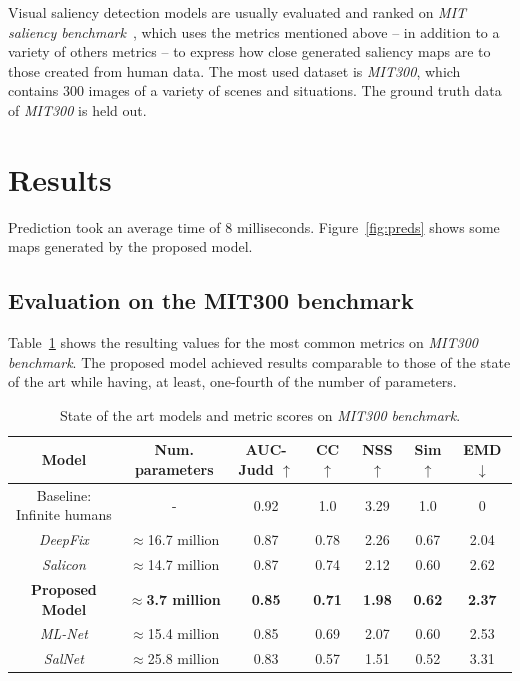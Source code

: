\documentclass[10pt,twocolumn,letterpaper]{article}
\begin{document}
Visual saliency detection models are usually evaluated and ranked on
\emph{MIT saliency benchmark}~\cite{mit_sal_bm}, which uses the metrics
mentioned above -- in addition to a variety of others metrics --
to express how close generated saliency maps are to those created
from human data.
The most used dataset is \emph{MIT300},
which contains $300$ images of a variety of scenes and situations.
The ground truth data of \emph{MIT300} is held out.

\section{Results}
Prediction took an average time of 8 milliseconds.
Figure~\ref{fig:preds} shows some maps generated by the proposed model.

\subsection{Evaluation on the MIT300 benchmark}
Table~\ref{table:results} shows the resulting values for the most common
metrics on \emph{MIT300 benchmark}.
The proposed model achieved results comparable to those of the state of
the art while having, at least, one-fourth of the number of parameters.

\begin{table}
	\small
    \begin{center}
    \label{table:results}
    \caption{State of the art models and metric scores on
    \emph{MIT300 benchmark}.}
    \begin{tabular}{|c|c|c|c|c|c|c|}
        \hline
        Model & Num. parameters & AUC-Judd $\uparrow$ & CC $\uparrow$
            & NSS $\uparrow$ & Sim $\uparrow$ & EMD $\downarrow$\\
        \hline
        Baseline: Infinite humans & - & 0.92 & 1.0 & 3.29 & 1.0 & 0\\
        \hline
        \emph{DeepFix} & $\approx$16.7 million & 0.87 & 0.78
            & 2.26 & 0.67 & 2.04\\
        \hline
        \emph{Salicon} & $\approx$14.7 million & 0.87 & 0.74 & 2.12
            & 0.60 & 2.62\\
        \hline
        \textbf{Proposed Model} & $\approx$\textbf{3.7 million}
            & \textbf{0.85} &
        \textbf{0.71} & \textbf{1.98} & \textbf{0.62} & \textbf{2.37}\\
        \hline
        \emph{ML-Net} & $\approx$15.4 million & 0.85 & 0.69 & 2.07 & 0.60
            & 2.53\\
        \hline
        \emph{SalNet} & $\approx$25.8 million & 0.83 & 0.57 & 1.51
            & 0.52 & 3.31\\
        \hline
    \end{tabular}
    \end{center}
\end{table}
\end{document}
